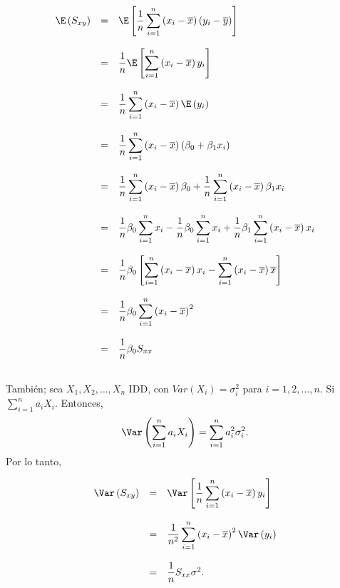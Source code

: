 $$
\begin{array}{rcl}
    \E\left(S_{xy}\right) &=& \E\left[\dfrac{1}{n}\displaystyle\sum_{i=1}^n \left(x_i-\overline{x}\right)\left(y_i-\overline{y}\right)\right]\\\\
			  &=& \dfrac{1}{n}\E\left[\displaystyle\sum_{i=1}^n \left(x_i-\overline{x}\right)y_i\right]\\\\
			  &=& \dfrac{1}{n}\displaystyle\sum_{i=1}^n \left(x_i-\overline{x}\right)\E\left(y_i\right)\\\\
			  &=& \dfrac{1}{n}\displaystyle\sum_{i=1}^n \left(x_i-\overline{x}\right)\left(\beta_0+\beta_1x_i\right)\\\\
			  &=& \dfrac{1}{n}\displaystyle\sum_{i=1}^n \left(x_i-\overline{x}\right)\beta_0+\dfrac{1}{n}\displaystyle\sum_{i=1}^n \left(x_i-\overline{x}\right)\beta_1x_i\\\\
			  &=& \dfrac{1}{n}\beta_{0}\displaystyle\sum_{i=1}^n x_i-\dfrac{1}{n}\beta_0\displaystyle\sum_{i=1}^n x_i+\dfrac{1}{n}\beta_1\displaystyle\sum_{i=1}^n \left(x_i-\overline{x}\right)x_i\\\\
			  &=& \dfrac{1}{n}\beta_{0}\left[\displaystyle\sum_{i=1}^n \left(x_i-\overline{x}\right)x_i-\displaystyle\sum_{i=1}^n \left(x_i-\overline{x}\right)\overline{x}\right]\\\\
			  &=& \dfrac{1}{n}\beta_{0}\displaystyle\sum_{i=1}^n \left(x_i-\overline{x}\right)^2\\\\
			  &=& \dfrac{1}{n}\beta_{0}S_{xx}\\\\
\end{array}
$$

También; sea $X_1,X_2,\ldots,X_n$ IDD, con $Var(X_i)=\sigma_i^2$ para $i=1,2,\ldots,n$. Si $\displaystyle\sum_{i=1}^n a_iX_i.$ Entonces, 
	$$\Var\left(\displaystyle\sum_{i=1}^n a_iX_i\right)=\displaystyle\sum_{i=1}^n a_i^2\sigma_i^2.$$ 
	Por lo tanto,

$$
\begin{array}{rcl}
    \Var\left(S_{xy}\right)&=&\Var\left[\dfrac{1}{n}\displaystyle\sum_{i=1}^n \left(x_i-\overline{x}\right)y_i\right]\\\\
			   &=& \dfrac{1}{n^2}\displaystyle\sum_{i=1}^n\left(x_i-\overline{x}\right)^2\Var\left(y_i\right)\\\\
			   &=& \dfrac{1}{n}S_{xx}\sigma^2.
\end{array}
$$

